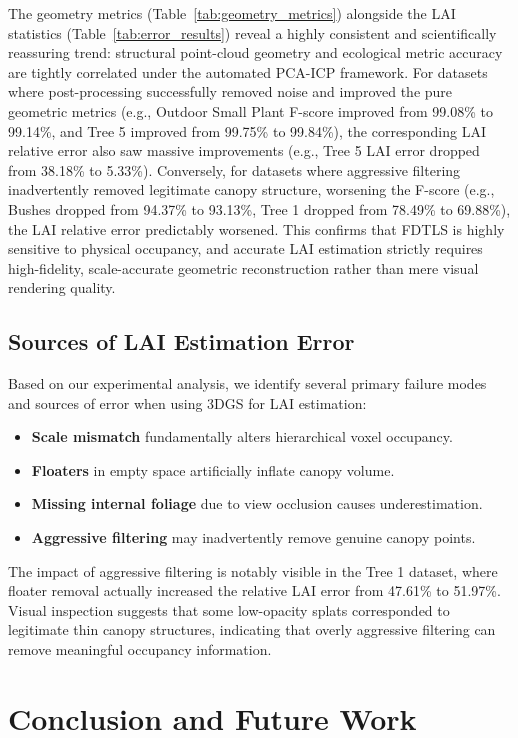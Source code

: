 \documentclass[10pt,twocolumn,letterpaper]{article}
\begin{document}
The geometry metrics (Table~\ref{tab:geometry_metrics}) alongside the LAI statistics (Table~\ref{tab:error_results}) reveal a highly consistent and scientifically reassuring trend: structural point-cloud geometry and ecological metric accuracy are tightly correlated under the automated PCA-ICP framework. For datasets where post-processing successfully removed noise and improved the pure geometric metrics (e.g., Outdoor Small Plant F-score improved from 99.08\% to 99.14\%, and Tree 5 improved from 99.75\% to 99.84\%), the corresponding LAI relative error also saw massive improvements (e.g., Tree 5 LAI error dropped from 38.18\% to 5.33\%). Conversely, for datasets where aggressive filtering inadvertently removed legitimate canopy structure, worsening the F-score (e.g., Bushes dropped from 94.37\% to 93.13\%, Tree 1 dropped from 78.49\% to 69.88\%), the LAI relative error predictably worsened. This confirms that FDTLS is highly sensitive to physical occupancy, and accurate LAI estimation strictly requires high-fidelity, scale-accurate geometric reconstruction rather than mere visual rendering quality.

\subsection{Sources of LAI Estimation Error}
Based on our experimental analysis, we identify several primary failure modes and sources of error when using 3DGS for LAI estimation:
\begin{itemize}
    \item \textbf{Scale mismatch} fundamentally alters hierarchical voxel occupancy.
    \item \textbf{Floaters} in empty space artificially inflate canopy volume.
    \item \textbf{Missing internal foliage} due to view occlusion causes underestimation.
    \item \textbf{Aggressive filtering} may inadvertently remove genuine canopy points.
\end{itemize}

The impact of aggressive filtering is notably visible in the Tree 1 dataset, where floater removal actually increased the relative LAI error from 47.61\% to 51.97\%. Visual inspection suggests that some low-opacity splats corresponded to legitimate thin canopy structures, indicating that overly aggressive filtering can remove meaningful occupancy information.

\section{Conclusion and Future Work}
\end{document}
